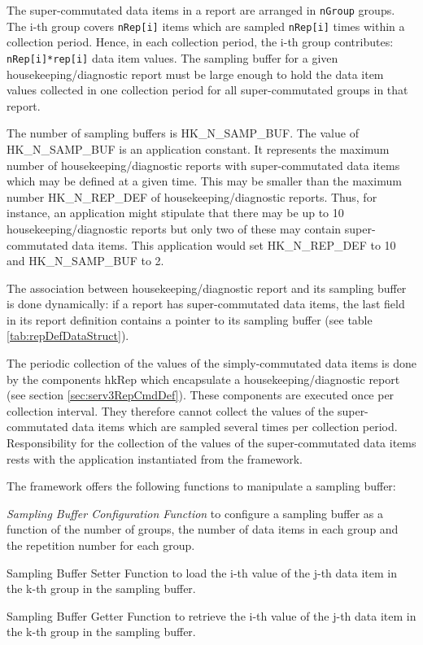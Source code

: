 \documentclass{pnp_article}
\begin{document}
The super-commutated data items in a report are arranged in \texttt{nGroup} groups. The i-th group covers \texttt{nRep[i]} items which are sampled \texttt{nRep[i]} times within a collection period. Hence, in each collection period, the i-th group contributes: \texttt{nRep[i]*rep[i]} data item values. The sampling buffer for a given housekeeping/diagnostic report must be large enough to hold the data item values collected in one collection period for all super-commutated groups in that report.

The number of sampling buffers is HK\_N\_SAMP\_BUF. The value of HK\_N\_SAMP\_BUF is an application constant. It represents the maximum number of housekeeping/diagnostic reports with super-commutated data items which may be defined at a given time. This may be smaller than the maximum number HK\_N\_REP\_DEF of housekeeping/diagnostic reports. Thus, for instance, an application might stipulate that there may be up to 10 housekeeping/diagnostic reports but only two of these may contain super-commutated data items. This application would set HK\_N\_REP\_DEF to 10 and  HK\_N\_SAMP\_BUF to 2.

The association between housekeeping/diagnostic report and its sampling buffer is done dynamically: if a report has super-commutated data items, the last field in its report definition contains a pointer to its sampling buffer (see table \ref{tab:repDefDataStruct}).

The periodic collection of the values of the simply-commutated data items is done by the components hkRep which encapsulate a housekeeping/diagnostic report (see section \ref{sec:serv3RepCmdDef}). These components are executed once per collection interval. They therefore cannot collect the values of the super-commutated data items which are sampled several times per collection period. Responsibility for the collection of the values of the super-commutated data items rests with the application instantiated from the framework. 

The framework offers the following functions to manipulate a sampling buffer:

\begin{fw_itemize}
\item \textit{Sampling Buffer Configuration Function} to configure a sampling buffer as a function of the number of groups, the number of data items in each group and the repetition number for each group.
\item Sampling Buffer Setter Function to load the i-th value of the j-th data item in the k-th group in the sampling buffer.
\item Sampling Buffer Getter Function to retrieve the i-th value of the j-th data item in the k-th group in the sampling buffer.
\end{fw_itemize}
\end{document}
